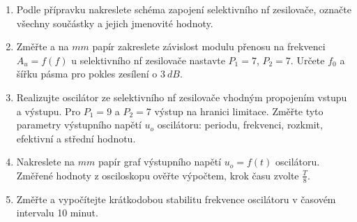 \begin{minipage}[H][11.48cm][c]{0.8\textwidth}
  \begin{enumerate}
    \item
      Podle přípravku nakreslete schéma zapojení selektivního nf zesilovače, označte všechny součástky a jejich jmenovité hodnoty.
    \item
      Změřte a na $mm$ papír zakreslete závislost modulu přenosu na frekvenci $A_u = f(f)$ u selektivního nf zesilovače nastavte $P_1 = 7$, $P_2 = 7$. Určete $f_0$ a šířku pásma pro pokles zesílení o $3~dB$.      
    \item
			Realizujte oscilátor ze selektivního nf zesilovače vhodným propojením vstupu a výstupu. Pro $P_1 = 9$ a $P_2 = 7$ výstup na hranici limitace. Změřte tyto parametry výstupního napětí $u_o$ oscilátoru: periodu, frekvenci, rozkmit, efektivní a střední hodnotu.
    \item
      Nakreslete na $mm$ papír graf výstupního napětí $u_o = f(t)$ oscilátoru. Změřené hodnoty z osciloskopu ověřte výpočtem, krok času zvolte $\frac{T}{8}$.
    \item
      Změřte a vypočítejte krátkodobou stabilitu frekvence oscilátoru v časovém intervalu 10 minut.
   \end{enumerate}
\end{minipage}


